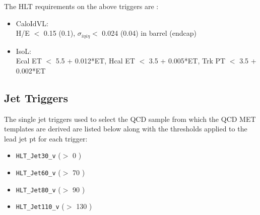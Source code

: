 The HLT requirements on the above triggers are \cite{ref:eghlt}:

\begin{itemize}
\item CaloIdVL: \\
  H/E $<$ 0.15 (0.1), $\sigma_{i\eta i\eta} <$ 0.024 (0.04) in barrel (endcap)
\item IsoL: \\
  Ecal ET $<$ 5.5 + 0.012*ET, %
  Hcal ET $<$ 3.5 + 0.005*ET, %
  Trk PT $<$ 3.5 + 0.002*ET 
\end{itemize}


\subsection{Jet Triggers}
\label{app:jettrig}

The single jet triggers used to select the QCD sample from which the QCD MET templates are derived are listed below along with the thresholds applied to the lead jet pt for each trigger:


\begin{itemize}
\item \verb=HLT_Jet30_v=  (\pt $>$ 0 )
\item \verb=HLT_Jet60_v=  (\pt $>$ 70 )
\item \verb=HLT_Jet80_v=  (\pt $>$ 90 )
\item \verb=HLT_Jet110_v= (\pt $>$ 130 )
\end{itemize}



